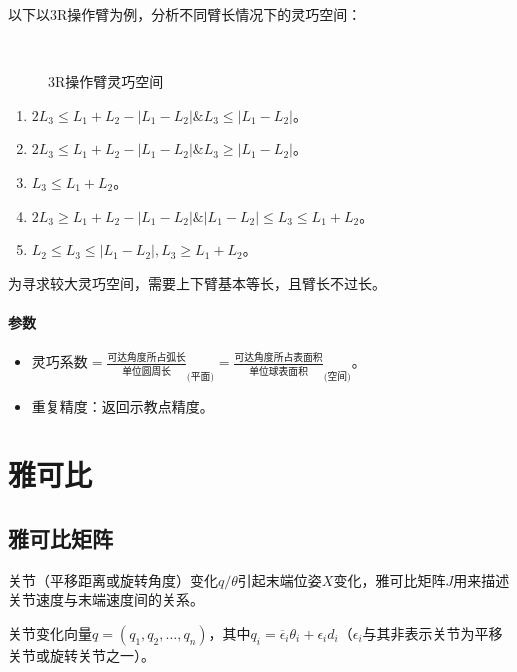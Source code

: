 \documentclass[
12pt, %
a4paper, 
oneside, %
headinclude,footinclude, %
]{scrartcl}
\begin{document}
以下以3R操作臂为例，分析不同臂长情况下的灵巧空间：
\begin{figure}[H]
\centering
{} \quad
{} \quad
{} \\
 \quad
{}
\caption[3R操作臂灵巧空间]{3R操作臂灵巧空间}
\end{figure}
\begin{enumerate}
\item $ 2L_3 \leq L_1 + L_2 - |L_1 - L_2|\&L_3 \leq |L_1 - L_2| $。
\item $ 2L_3 \leq L_1 + L_2 - |L_1 - L_2|\&L_3 \geq |L_1 - L_2| $。
\item $ L_3 \leq L_1 + L_2 $。
\item $ 2L_3 \geq L_1 + L_2 - |L_1 - L_2|\&|L_1 - L_2| \leq L_3 \leq L_1 + L_2 $。
\item $ L_2 \leq L_3 \leq |L_1 - L_2|, L_3 \geq L_1 + L_2 $。
\end{enumerate}

为寻求较大灵巧空间，需要上下臂基本等长，且臂长不过长。
\paragraph{参数}
\begin{itemize}
\item $ \text{灵巧系数} = \frac{\text{可达角度所占弧长}}{\text{单位圆周长}}_{\text{(平面)}} = \frac{\text{可达角度所占表面积}}{\text{单位球表面积}}_{\text{(空间)}} $。
\item 重复精度：返回示教点精度。
\end{itemize} 
\section{雅可比}
\subsection{雅可比矩阵}
关节（平移距离或旋转角度）变化$ q/\theta $引起末端位姿$ X $变化，雅可比矩阵$ J $用来描述关节速度与末端速度间的关系。

关节变化向量$ q = (q_1, q_2, \dots, q_n) $，其中$ q_i = \overline{\epsilon}_i\theta_i + \epsilon_id_i $（$ \epsilon_i $与其非表示关节为平移关节或旋转关节之一）。
\end{document}
